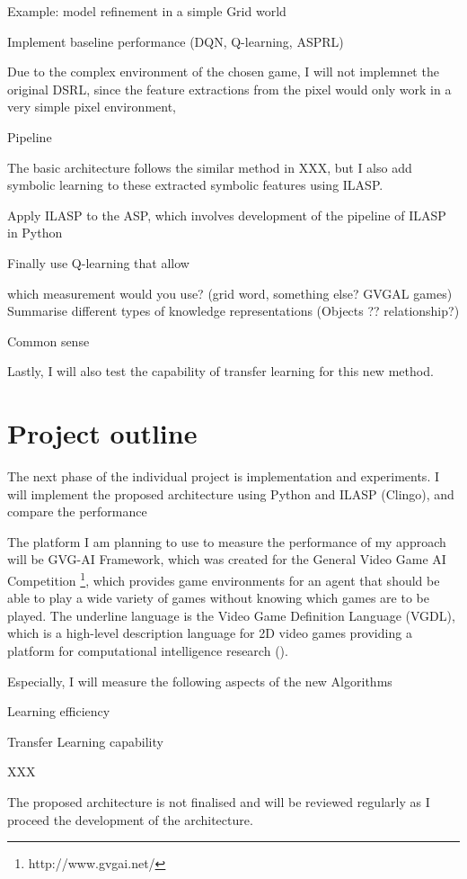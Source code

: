\documentclass[12pt,twoside]{report}
\begin{document}
Example: model refinement in a simple Grid world


Implement baseline performance (DQN, Q-learning, ASPRL)

Due to the complex environment of the chosen game, I will not implemnet the original DSRL, since the feature extractions from the pixel would only work in a very simple pixel environment,

Pipeline

The basic architecture follows the similar method in XXX, but I also add symbolic learning to these extracted symbolic features using ILASP.

Apply ILASP to the ASP, which involves development of the pipeline of ILASP in Python

Finally use Q-learning that allow

which measurement would you use? (grid word, something else? GVGAL games)
Summarise different types of knowledge representations (Objects ?? relationship?)

Common sense

Lastly, I will also test the capability of transfer learning for this new method.

\section{Project outline}

The next phase of the individual project is implementation and experiments. I will implement the proposed architecture using Python and ILASP (Clingo), and compare the performance

The platform I am planning to use to measure the performance of my approach will be GVG-AI Framework, which was created for the General Video Game AI Competition \footnote{http://www.gvgai.net/}, which provides game environments for an agent that should be able to play a wide variety of games without knowing which games are to be played.
The underline language is the Video Game Definition Language (VGDL), which is a high-level description language for 2D video games providing a platform for computational intelligence research (\cite{Schaul2013}).

Especially, I will measure the following aspects of the new Algorithms

Learning efficiency

Transfer Learning capability

XXX


The proposed architecture is not finalised and will be reviewed regularly as I proceed the development of the architecture.
\end{document}
